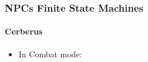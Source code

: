 \subsubsection{NPCs Finite State Machines}

\paragraph{Cerberus}
\begin{itemize}
\item In Combat mode: 
\end{itemize}
\pagebreak
